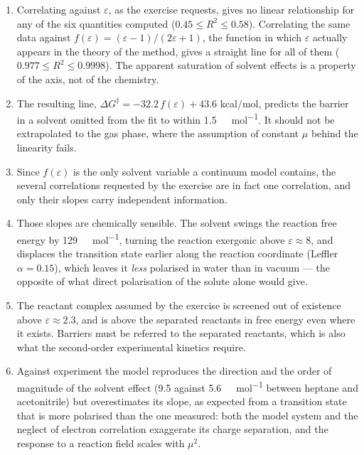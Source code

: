 \documentclass[10pt,a4paper]{article}
\begin{document}
\begin{enumerate}
  \item Correlating against $\varepsilon$, as the exercise requests, gives no linear
    relationship for any of the six quantities computed
    ($0.45 \leq R^{2} \leq 0.58$). Correlating the same data against
    $f(\varepsilon) = (\varepsilon-1)/(2\varepsilon+1)$, the function in which
    $\varepsilon$ actually appears in the theory of the method, gives a straight
    line for all of them ($0.977 \leq R^{2} \leq 0.9998$). The apparent saturation
    of solvent effects is a property of the axis, not of the chemistry.

  \item The resulting line, $\Delta G^{\ddagger} = -32.2\,f(\varepsilon) + 43.6$
    kcal/mol, predicts the barrier in a solvent omitted from the fit to within
    \SI{1.5}{\kilo\calorie\per\mole}. It should not be extrapolated to the gas
    phase, where the assumption of constant $\mu$ behind the linearity fails.

  \item Since $f(\varepsilon)$ is the only solvent variable a continuum model
    contains, the several correlations requested by the exercise are in fact one
    correlation, and only their slopes carry independent information.

  \item Those slopes are chemically sensible. The solvent swings the reaction free
    energy by \SI{129}{\kilo\calorie\per\mole}, turning the reaction exergonic above
    $\varepsilon \approx 8$, and displaces the transition state earlier along the
    reaction coordinate (Leffler $\alpha = 0.15$), which leaves it \emph{less}
    polarised in water than in vacuum --- the opposite of what direct polarisation of
    the solute alone would give.

  \item The reactant complex assumed by the exercise is screened out of existence
    above $\varepsilon \approx 2.3$, and is above the separated reactants in free
    energy even where it exists. Barriers must be referred to the separated
    reactants, which is also what the second-order experimental kinetics require.

  \item Against experiment the model reproduces the direction and the order of
    magnitude of the solvent effect (\SI{9.5}{} against
    \SI{5.6}{\kilo\calorie\per\mole} between heptane and acetonitrile) but
    overestimates its slope, as expected from a transition state that is more
    polarised than the one measured: both the model system and the neglect of
    electron correlation exaggerate its charge separation, and the response to a
    reaction field scales with $\mu^{2}$.
\end{enumerate}
\end{document}
